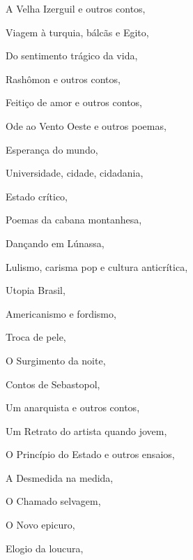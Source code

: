 \begin{multicols}{2}
\begin{enumerate}
{\item A Velha Izerguil e outros contos, {}
\item Viagem à turquia, bálcãs e Egito, {}
\item Do sentimento trágico da vida, {}
\item Rashômon e outros contos, {}
\item Feitiço de amor e outros contos, {}
\item Ode ao Vento Oeste e outros poemas, {}
\item Esperança do mundo, {}
\item Universidade, cidade, cidadania, {}
\item Estado crítico, {}
\item Poemas da cabana montanhesa, {}
\item Dançando em Lúnassa, {}
\item Lulismo, carisma pop e cultura anticrítica, {}
\item Utopia Brasil, {}
\item Americanismo e fordismo, {}
\item Troca de pele, {}
\item O Surgimento da noite, {}
\item Contos de Sebastopol, {}
\item Um anarquista e outros contos, {}
\item Um Retrato do artista quando jovem, {}
\item O Princípio do Estado e outros ensaios, {}
\item A Desmedida na medida, {}
\item O Chamado selvagem, {}
\item O Novo epicuro, {}
\item Elogio da loucura, {}
}
\end{enumerate}
\end{multicols}
